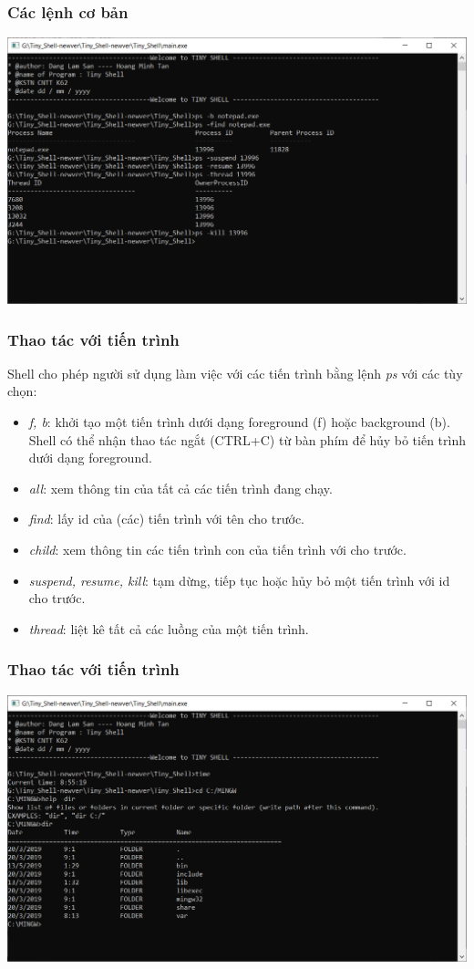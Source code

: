 \documentclass{beamer}
\begin{document}
\begin{frame}
\frametitle{Các lệnh cơ bản}
\begin{center}
\includegraphics[scale=0.45]{process.png}
\end{center}
\end{frame}

\begin{frame}
\frametitle{Thao tác với tiến trình}
Shell cho phép người sử dụng làm việc với các tiến trình bằng lệnh \textit{ps} với các tùy chọn:\pause
\begin{itemize}
\item \textit{f, b}: khởi tạo một tiến trình dưới dạng foreground (f) hoặc background (b). Shell có thể nhận thao tác ngắt (CTRL+C) từ bàn phím để hủy bỏ tiến trình dưới dạng foreground.\pause
\item \textit{all}: xem thông tin của tất cả các tiến trình đang chạy.\pause
\item \textit{find}: lấy id của (các) tiến trình với tên cho trước.\pause
\item \textit{child}: xem thông tin các tiến trình con của tiến trình với cho trước.\pause
\item \textit{suspend, resume, kill}: tạm dừng, tiếp tục hoặc hủy bỏ một tiến trình với id cho trước.\pause
\item \textit{thread}: liệt kê tất cả các luồng của một tiến trình.
\end{itemize}
\end{frame}

\begin{frame}
\frametitle{Thao tác với tiến trình}
\begin{center}
\includegraphics[scale=0.45]{basic.png}
\end{center}
\end{frame}
\end{document}
